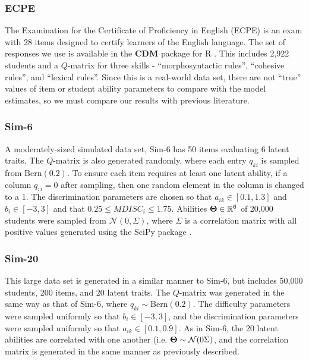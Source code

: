 \subsubsection*{ECPE} The Examination for the Certificate of Proficiency in English (ECPE) is an exam with 28 items designed to certify learners of the English language. The set of responses we use is available in the \textbf{CDM} package for R \cite{cdm}. This includes 2,922 students and a $Q$-matrix for three skills - ``morphosyntactic rules'', ``cohesive rules'', and ``lexical rules''. Since this is a real-world data set, there are not ``true'' values of item or student ability parameters to compare with the model estimates, so we must compare our results with previous literature.

\subsubsection*{Sim-6} A moderately-sized simulated data set, Sim-6 has 50 items evaluating 6 latent traits. The $Q$-matrix is also generated randomly, where each entry $q_{ki}$ is sampled from $\text{Bern}(0.2)$. To ensure each item requires at least one latent ability, if a column $q_{:i} = 0$ after sampling, then one random element in the column is changed to a 1. The discrimination parameters are chosen so that $a_{ik} \in [0.1, 1.3]$ and $b_i \in[-3,3]$ and that $0.25 \leq MDISC_i \leq 1.75$. Abilities $\boldsymbol{\Theta} \in \mathbb{R}^6$ of 20,000 students were sampled from $\mathcal{N}(0, \Sigma)$, where $\Sigma$ is a correlation matrix with all positive values generated using the SciPy package \cite{SciPy}.

\subsubsection*{Sim-20} This large data set is generated in a similar manner to Sim-6, but includes 50,000 students, 200 items, and 20 latent traits. The $Q$-matrix was generated in the same way as that of Sim-6, where $q_{ki} \sim \text{Bern}(0.2)$. The difficulty parameters were sampled uniformly so that $b_i \in [-3,3]$, and the discrimination parameters were sampled uniformly so that $a_{ik} \in [0.1, 0.9]$. As in Sim-6, the 20 latent abilities are correlated with one another (i.e. $\boldsymbol{\Theta} \sim \mathcal{N}(0 \Sigma)$, and the correlation matrix is generated in the same manner as previously described.
